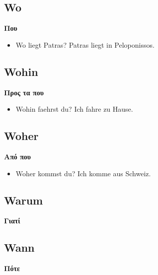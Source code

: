 \subsection{Wo}

\textbf{Που}

\begin{itemize}
 \item Wo liegt Patras? Patras liegt in Peloponissos.
\end{itemize}


\subsection{Wohin}

\textbf{Προς τα που}

\begin{itemize}
 \item Wohin faehrst du? Ich fahre zu Hause.
\end{itemize}


\subsection{Woher}

\textbf{Από που}

\begin{itemize}
 \item Woher kommst du? Ich komme aus Schweiz.
\end{itemize}


\subsection{Warum}

\textbf{Γιατί}

\subsection{Wann}

\textbf{Πότε}
